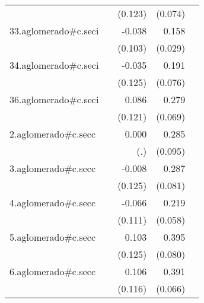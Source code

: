 {\begin{longtable}{l*{4}{D{.}{.}{-1}}}
            &                     &     (0.123)         &     (0.074)         &                     \\
\addlinespace
33.aglomerado#c.seci&                     &      -0.038         &       0.158\sym{***}&                     \\
            &                     &     (0.103)         &     (0.029)         &                     \\
\addlinespace
34.aglomerado#c.seci&                     &      -0.035         &       0.191\sym{*}  &                     \\
            &                     &     (0.125)         &     (0.076)         &                     \\
\addlinespace
36.aglomerado#c.seci&                     &       0.086         &       0.279\sym{***}&                     \\
            &                     &     (0.121)         &     (0.069)         &                     \\
\addlinespace
2.aglomerado#c.secc&                     &       0.000         &       0.285\sym{**} &                     \\
            &                     &         (.)         &     (0.095)         &                     \\
\addlinespace
3.aglomerado#c.secc&                     &      -0.008         &       0.287\sym{***}&                     \\
            &                     &     (0.125)         &     (0.081)         &                     \\
\addlinespace
4.aglomerado#c.secc&                     &      -0.066         &       0.219\sym{***}&                     \\
            &                     &     (0.111)         &     (0.058)         &                     \\
\addlinespace
5.aglomerado#c.secc&                     &       0.103         &       0.395\sym{***}&                     \\
            &                     &     (0.125)         &     (0.080)         &                     \\
\addlinespace
6.aglomerado#c.secc&                     &       0.106         &       0.391\sym{***}&                     \\
            &                     &     (0.116)         &     (0.066)         &                     \\

\end{longtable}}
